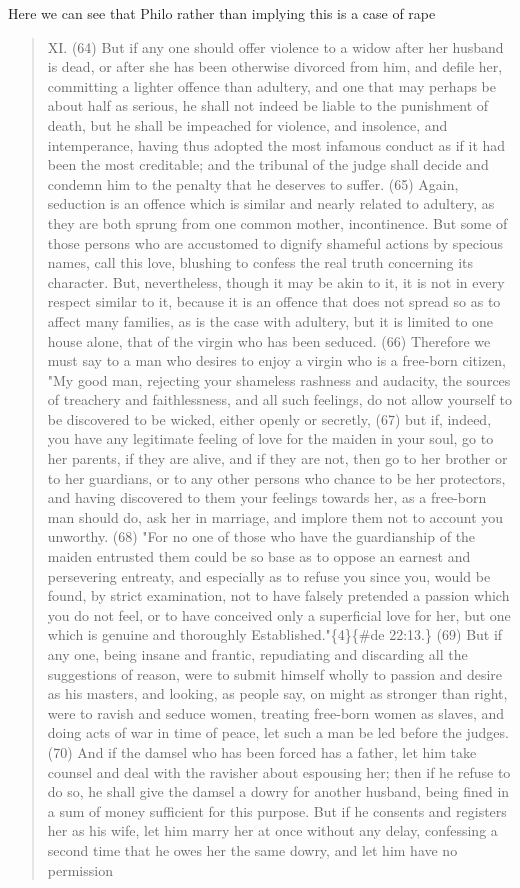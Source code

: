 \documentclass[11pt]{article}
\begin{document}
Here we can see that Philo rather than implying this is a case of rape 

\begin{quote}
XI. (64) But if any one should offer violence to a widow after her husband is dead, or after she has been otherwise divorced from him, and defile her, committing a lighter offence than adultery, and one that may perhaps be about half as serious, he shall not indeed be liable to the punishment of death, but he shall be impeached for violence, and insolence, and intemperance, having thus adopted the most infamous conduct as if it had been the most creditable; and the tribunal of the judge shall decide and condemn him to the penalty that he deserves to suffer. (65) Again, seduction is an offence which is similar and nearly related to adultery, as they are both sprung from one common mother, incontinence. But some of those persons who are accustomed to dignify shameful actions by specious names, call this love, blushing to confess the real truth concerning its character. But, nevertheless, though it may be akin to it, it is not in every respect similar to it, because it is an offence that does not spread so as to affect many families, as is the case with adultery, but it is limited to one house alone, that of the virgin who has been seduced. (66) Therefore we must say to a man who desires to enjoy a virgin who is a free-born citizen, "My good man, rejecting your shameless rashness and audacity, the sources of treachery and faithlessness, and all such feelings, do not allow yourself to be discovered to be wicked, either openly or secretly, (67) but if, indeed, you have any legitimate feeling of love for the maiden in your soul, go to her parents, if they are alive, and if they are not, then go to her brother or to her guardians, or to any other persons who chance to be her protectors, and having discovered to them your feelings towards her, as a free-born man should do, ask her in marriage, and implore them not to account you unworthy. (68) "For no one of those who have the guardianship of the maiden entrusted them could be so base as to oppose an earnest and persevering entreaty, and especially as to refuse you since you, would be found, by strict examination, not to have falsely pretended a passion which you do not feel, or to have conceived only a superficial love for her, but one which is genuine and thoroughly Established."\{4\}\{\#de 22:13.\} (69) But if any one, being insane and frantic, repudiating and discarding all the suggestions of reason, were to submit himself wholly to passion and desire as his masters, and looking, as people say, on might as stronger than right, were to ravish and seduce women, treating free-born women as slaves, and doing acts of war in time of peace, let such a man be led before the judges. (70) And if the damsel who has been forced has a father, let him take counsel and deal with the ravisher about espousing her; then if he refuse to do so, he shall give the damsel a dowry for another husband, being fined in a sum of money sufficient for this purpose. But if he consents and registers her as his wife, let him marry her at once without any delay, confessing a second time that he owes her the same dowry, and let him have no permission 
\end{quote}
\end{document}
